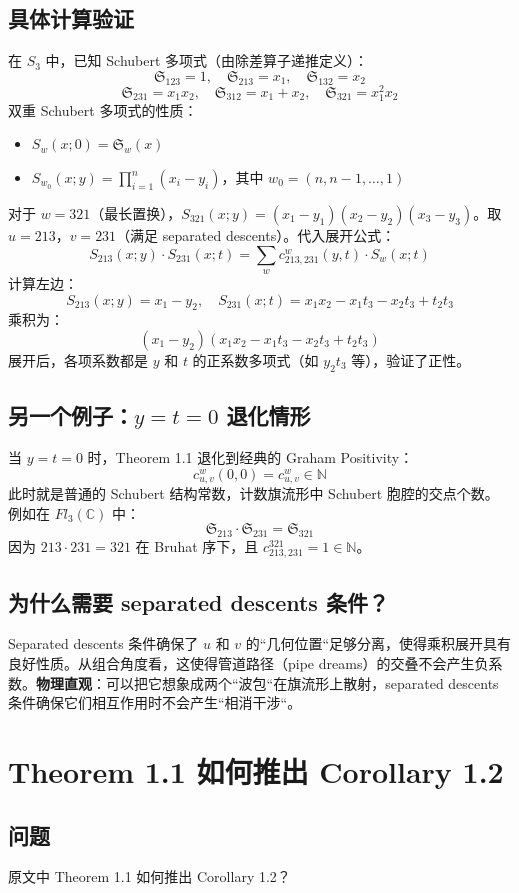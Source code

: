 \subsection{具体计算验证}在 $S_3$ 中，已知 Schubert 多项式（由除差算子递推定义）：$$\mathfrak{S}_{123} = 1, \quad \mathfrak{S}_{213} = x_1, \quad \mathfrak{S}_{132} = x_2$$$$\mathfrak{S}_{231} = x_1 x_2, \quad \mathfrak{S}_{312} = x_1 + x_2, \quad \mathfrak{S}_{321} = x_1^2 x_2$$双重 Schubert 多项式的性质：
\begin{itemize}
\item $S_w(x; 0) = \mathfrak{S}_w(x)$\item $S_{w_0}(x; y) = \prod_{i=1}^n (x_i - y_i)$，其中 $w_0 = (n, n-1, \ldots, 1)$
\end{itemize}对于 $w = 321$（最长置换），$S_{321}(x; y) = (x_1 - y_1)(x_2 - y_2)(x_3 - y_3)$。取 $u = 213$，$v = 231$（满足 separated descents）。代入展开公式：$$S_{213}(x; y) \cdot S_{231}(x; t) = \sum_w c^w_{213,231}(y, t) \cdot S_w(x; t)$$计算左边：$$S_{213}(x; y) = x_1 - y_2, \quad S_{231}(x; t) = x_1 x_2 - x_1 t_3 - x_2 t_3 + t_2 t_3$$乘积为：$$(x_1 - y_2)(x_1 x_2 - x_1 t_3 - x_2 t_3 + t_2 t_3)$$展开后，各项系数都是 $y$ 和 $t$ 的正系数多项式（如 $y_2 t_3$ 等），验证了正性。
\subsection{另一个例子：$y = t = 0$ 退化情形}当 $y = t = 0$ 时，Theorem 1.1 退化到经典的 Graham Positivity：$$c^w_{u,v}(0, 0) = c^w_{u,v} \in \mathbb{N}$$此时就是普通的 Schubert 结构常数，计数旗流形中 Schubert 胞腔的交点个数。例如在 $Fl_3(\mathbb{C})$ 中：$$\mathfrak{S}_{213} \cdot \mathfrak{S}_{231} = \mathfrak{S}_{321}$$因为 $213 \cdot 231 = 321$ 在 Bruhat 序下，且 $c^{321}_{213,231} = 1 \in \mathbb{N}$。
\subsection{为什么需要 separated descents 条件？}Separated descents 条件确保了 $u$ 和 $v$ 的``几何位置``足够分离，使得乘积展开具有良好性质。从组合角度看，这使得管道路径（pipe dreams）的交叠不会产生负系数。\textbf{物理直观}：可以把它想象成两个``波包``在旗流形上散射，separated descents 条件确保它们相互作用时不会产生``相消干涉``。
\section{Theorem 1.1 如何推出 Corollary 1.2}\label{sec:Thm1toCor1}
\subsection{问题}
原文中 Theorem 1.1 如何推出 Corollary 1.2？

